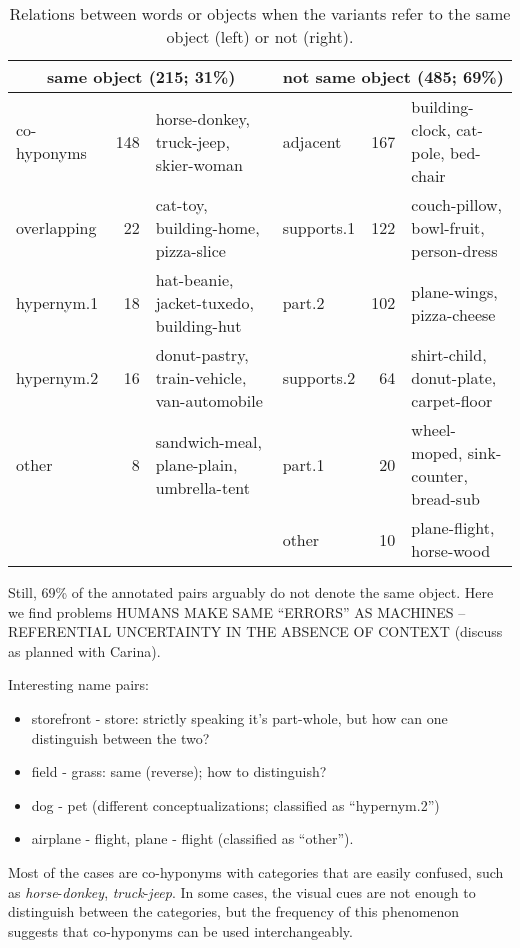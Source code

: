 \begin{table*}
  \label{tab:crossclass}
\small
\begin{tabular}{lrl|lrl}
  \toprule
    \multicolumn{3}{c}{same object (215; 31\%)} & \multicolumn{3}{c}{not same object (485; 69\%)}\\
\midrule
co-hyponyms &          148  & horse-donkey, truck-jeep, skier-woman & adjacent   &          167 & building-clock, cat-pole, bed-chair\\
overlapping &           22  & cat-toy, building-home, pizza-slice & supports.1 &          122 & couch-pillow, bowl-fruit, person-dress\\
hypernym.1  &           18  & hat-beanie, jacket-tuxedo, building-hut & part.2     &102& plane-wings, pizza-cheese\\
hypernym.2  &           16  & donut-pastry, train-vehicle, van-automobile & supports.2 &           64 & shirt-child, donut-plate, carpet-floor\\
other       &            8  & sandwich-meal, plane-plain, umbrella-tent & part.1     &           20 & wheel-moped, sink-counter, bread-sub\\
	    & 		    & & other      &           10 & plane-flight, horse-wood\\
\bottomrule
\end{tabular}
\caption{Relations between words or objects when the variants refer to the same object (left) or not (right).}
\end{table*}

Still, 69\% of the annotated pairs arguably do not denote the same object. Here we find problems HUMANS MAKE SAME ``ERRORS'' AS MACHINES -- REFERENTIAL UNCERTAINTY IN THE ABSENCE OF CONTEXT (discuss as planned with Carina).


Interesting name pairs:

\begin{itemize}
\item storefront - store: strictly speaking it's part-whole, but how can one distinguish between the two? 
\item field - grass: same (reverse); how to distinguish?
\item dog - pet (different conceptualizations; classified as ``hypernym.2'')
\item airplane - flight, plane - flight (classified as ``other'').
\end{itemize}


Most of the cases are co-hyponyms with categories that are easily confused, such as \textit{horse}-\textit{donkey}, \textit{truck}-\textit{jeep}.
In some cases, the visual cues are not enough to distinguish between the categories, but the frequency of this phenomenon suggests that co-hyponyms can be used interchangeably.


